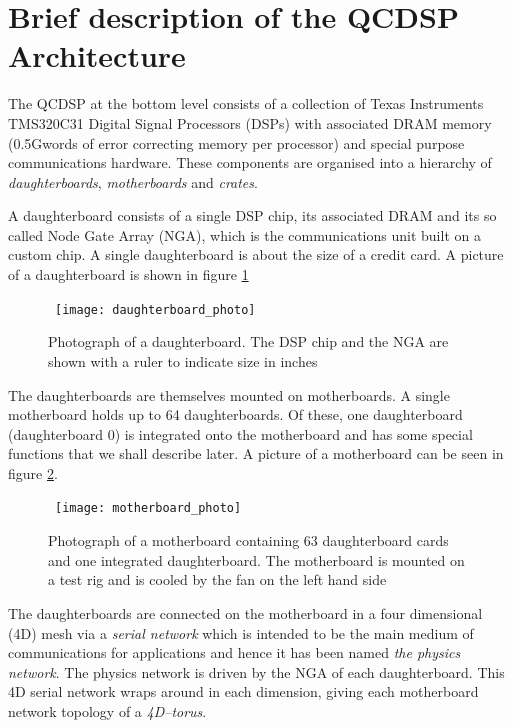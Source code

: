 \section{Brief description of the QCDSP Architecture}
The QCDSP at the bottom level consists of a collection of Texas
Instruments TMS320C31 Digital Signal Processors (DSPs) with associated
DRAM memory (0.5Gwords of error correcting memory per processor) and
special purpose communications hardware. These components are
organised into a hierarchy of {\em daughterboards}, {\em motherboards}
and {\em crates}.

A daughterboard consists of a single DSP chip, its associated DRAM and 
its so called Node Gate Array (NGA), which is the communications unit
built on a custom chip. A single daughterboard is about the size of a 
credit card. A picture of a daughterboard is shown in figure \ref{f:daughterBoard}
\begin{figure}[ht]
\begin{center}
\leavevmode
\hbox{%
\texttt{[image: daughterboard\_photo]}
}
\end{center}
\caption{Photograph of a daughterboard. The DSP chip and the NGA are shown
with a ruler to indicate size in inches}
\label{f:daughterBoard}
\end{figure}

The daughterboards are themselves mounted on motherboards. A single
motherboard holds up to 64 daughterboards. Of these, one daughterboard
(daughterboard 0) is integrated onto the motherboard and has some 
special functions that we shall describe later. A picture of a motherboard 
can be seen in figure \ref{f:motherBoard}.

\begin{figure}[ht]
\begin{center}
\leavevmode
\hbox{%
\texttt{[image: motherboard\_photo]}
}
\end{center}
\caption{Photograph of a motherboard containing 63 daughterboard cards and
one integrated daughterboard. The motherboard is mounted on a test rig and 
is cooled by the fan on the left hand side}
\label{f:motherBoard}
\end{figure}

The daughterboards are connected on the motherboard in a four dimensional 
(4D) mesh via a {\em serial network} which is intended to be the main 
medium of communications for applications and hence it has been named
{\em the physics network}. The physics network is driven by the NGA 
of each daughterboard. This 4D serial network wraps around in each dimension,
giving each motherboard network topology of a {\em 4D--torus}.

